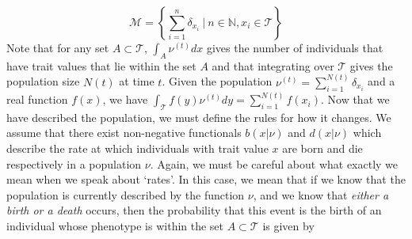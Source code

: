 \begin{equation*}
    \mathcal{M} = \left\{\sum\limits_{i=1}^{n}\delta_{x_i} \ | \ n \in \mathbb{N}, x_i \in \mathcal{T}\right\}
\end{equation*}
Note that for any set $A \subset \mathcal{T}$, $\int_A\nu^{(t)}dx$ gives the number of individuals that have trait values that lie within the set $A$ and that integrating over $\mathcal{T}$ gives the population size $N(t)$ at time $t$. Given the population $\nu^{(t)} = \sum_{i=1}^{N(t)}\delta_{x_i}$ and a real function $f(x)$, we have $\int_{\mathcal{T}}f(y)\nu^{(t)}dy = \sum_{i=1}^{N(t)}f(x_i)$.
Now that we have described the population, we must define the rules for how it changes. We assume that there exist non-negative functionals $b(x|\nu)$ and $d(x|\nu)$ which describe the rate at which individuals with trait value $x$ are born and die respectively in a population $\nu$. Again, we must be careful about what exactly we mean when we speak about `rates'. In this case, we mean that if we know that the population is currently described by the function $\nu$, and we know that \emph{either a birth or a death} occurs, then the probability that this event is the birth of an individual whose phenotype is within the set $A \subset \mathcal{T}$ is given by
